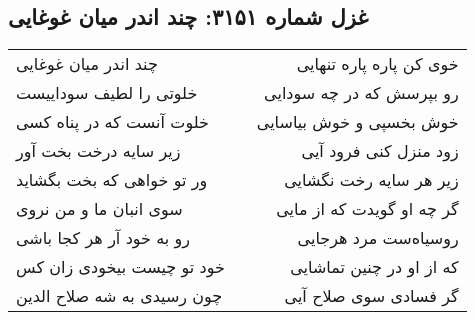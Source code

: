 \begin{center}
\section*{غزل شماره ۳۱۵۱: چند اندر میان غوغایی}
\label{sec:3151}
\begin{longtable}{l p{0.5cm} r}
چند اندر میان غوغایی
&&
خوی کن پاره پاره تنهایی
\\
خلوتی را لطیف سوداییست
&&
رو بپرسش که در چه سودایی
\\
خلوت آنست که در پناه کسی
&&
خوش بخسپی و خوش بیاسایی
\\
زیر سایه درخت بخت آور
&&
زود منزل کنی فرود آیی
\\
ور تو خواهی که بخت بگشاید
&&
زیر هر سایه رخت نگشایی
\\
سوی انبان ما و من نروی
&&
گر چه او گویدت که از مایی
\\
رو به خود آر هر کجا باشی
&&
روسیاه‌ست مرد هرجایی
\\
خود تو چیست بیخودی زان کس
&&
که از او در چنین تماشایی
\\
چون رسیدی به شه صلاح الدین
&&
گر فسادی سوی صلاح آیی
\\
\end{longtable}
\end{center}
